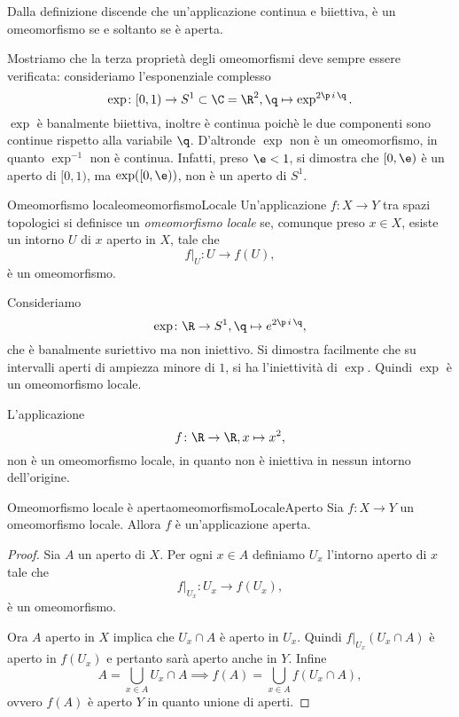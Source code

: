 \begin{oss}
	Dalla definizione discende che un'applicazione continua e biiettiva, è un omeomorfismo se e soltanto se è aperta.
\end{oss}

\begin{ese}
	Mostriamo che la terza proprietà degli omeomorfismi deve sempre essere verificata: consideriamo l'esponenziale complesso
	\[
		\exp\colon [0,1)\to S^1\subset\C=\R^2,\q\mapsto\exp^{2\p\,i\,\q}.
	\]
	\(\exp\) è banalmente biiettiva, inoltre è continua poichè le due componenti sono continue rispetto alla variabile \(\q\).
	D'altronde \(\exp\) non è un omeomorfismo, in quanto \(\exp^{-1}\) non è continua.
	Infatti, preso \(\e<1\), si dimostra che \([0,\e)\) è un aperto di \([0,1)\), ma \(\exp([0,\e))\), non è un aperto di \(S^1\).
\end{ese}

\begin{defn}{Omeomorfismo locale}{omeomorfismoLocale}
	Un'applicazione \(f\colon X\to Y\) tra spazi topologici si definisce un \emph{omeomorfismo locale} se, comunque preso \(x\in X\), esiste un intorno \(U\) di \(x\) aperto in \(X\), tale che
	\[
		f|_U\colon U\to f(U),
	\]
	è un omeomorfismo.
\end{defn}

\begin{ese}
	Consideriamo
	\[
		\exp\colon \R\to S^1,\q\mapsto e^{2\p\,i\,\q},
	\]
	che è banalmente suriettivo ma non iniettivo.
	Si dimostra facilmente che su intervalli aperti di ampiezza minore di \(1\), si ha l'iniettività di \(\exp\).
	Quindi \(\exp\) è un omeomorfismo locale.
\end{ese}

\begin{ese}
	L'applicazione
	\[
		f\colon\R\to\R,x\mapsto x^2,
	\]
	non è un omeomorfismo locale, in quanto non è iniettiva in nessun intorno dell'origine.
\end{ese}

\begin{prop}{Omeomorfismo locale è aperta}{omeomorfismoLocaleAperto}
	Sia \(f\colon X\to Y\) un omeomorfismo locale.
	Allora \(f\) è un'applicazione aperta.
\end{prop}

\begin{proof}
	Sia \(A\) un aperto di \(X\).
	Per ogni \(x\in A\) definiamo \(U_x\) l'intorno aperto di \(x\) tale che
	\[
		f|_{U_x}\colon U_x \to f(U_x),
	\]
	è un omeomorfismo.

	Ora \(A\) aperto in \(X\) implica che \(U_x\cap A\) è aperto in \(U_x\).
	Quindi \(f|_{U_x}(U_x\cap A)\) è aperto in \(f(U_x)\) e pertanto sarà aperto anche in \(Y\).
	Infine
	\[
		A = \bigcup_{x\in A} U_x \cap A \implies f(A) = \bigcup_{x\in A} f(U_x \cap A),
	\]
	ovvero \(f(A)\) è aperto \(Y\) in quanto unione di aperti.
\end{proof}

